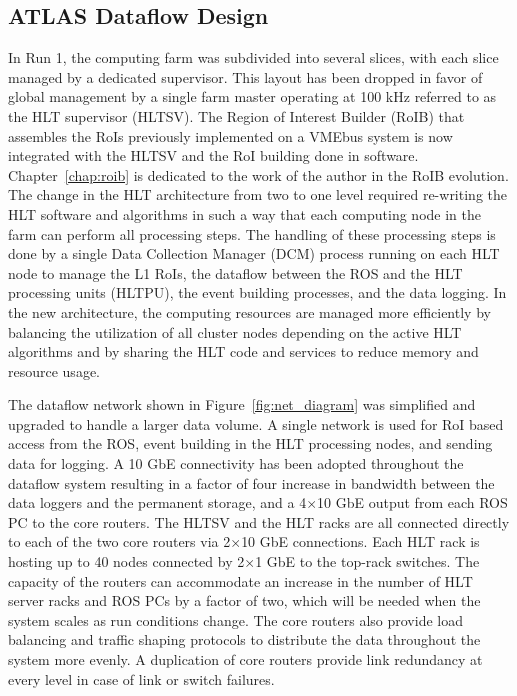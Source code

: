 \subsection{ATLAS Dataflow Design}

In Run 1, the computing farm was subdivided into several slices, with 
each slice managed by a dedicated supervisor. This layout has been 
dropped in favor of global management by a single farm master 
operating at 100 kHz referred to as the HLT supervisor (HLTSV). 
The Region of Interest Builder (RoIB) that assembles the RoIs
previously implemented on a VMEbus 
system is now integrated with the HLTSV and the RoI building done in software.
Chapter~\ref{chap:roib} is dedicated to the work of the author in the RoIB evolution. 
The change in the HLT architecture from two to one level
required re-writing the HLT software and algorithms in such a way that 
each computing node in the farm can perform all processing steps. The handling of these
processing steps is done by a single Data Collection Manager (DCM) process 
running on each HLT node to manage the L1 RoIs, the dataflow 
between the ROS and the HLT processing units (HLTPU), 
the event building processes, and the data logging.
 In the new architecture, the computing resources are managed more efficiently
by balancing the utilization of all cluster nodes depending on the active HLT 
algorithms and by sharing the HLT code and services to reduce memory and 
resource usage. 

The dataflow network shown in Figure~\ref{fig:net_diagram} was simplified and upgraded to handle a larger data volume.
A single network is used for 
RoI based access from the ROS, event 
building in the HLT processing nodes, and sending data for logging. 
A 10 GbE connectivity has been adopted throughout  the dataflow system
resulting in a factor of four increase in bandwidth between the data loggers and
the permanent storage, and a 4$\times$10 GbE output from each ROS PC to the core routers. 
The HLTSV and the HLT racks are all connected directly to each of the two core routers via 
 2$\times$10 GbE connections. Each HLT rack is hosting up to 40 nodes connected by 2$\times$1 GbE to the top-rack switches. 
The capacity of the routers can accommodate
an increase in the number of HLT server racks and ROS PCs by a factor of two, 
which will be needed when the system scales as run conditions 
change. The core routers also provide load balancing and traffic shaping protocols \cite{1742-6596-396-1-012033}
to distribute the data throughout the system more evenly. A duplication of core routers provide link redundancy at every level in 
case of link or switch failures.


